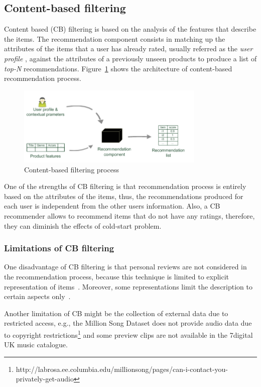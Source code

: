 \subsection{Content-based filtering}
Content based (CB) filtering is based on the analysis of the features that describe the items. The recommendation component consists in matching up the attributes of the items that a user has already rated, usually referred as the \textit{user profile} \parencite{Lops2011}, against the attributes of a previously unseen products to produce a list of \emph{top-N} recommendations. Figure~\ref{fig:cb} shows the architecture of content-based recommendation process.
\begin{figure}[ht!]
	\centering
	\includegraphics[width=0.8\textwidth]{chapter2/content-based-recommender1.png}
	\caption{Content-based filtering process \parencite{1_blogseagatesoftcom_2015}}
	\label{fig:cb}
\end{figure}

One of the strengths of CB filtering is that recommendation process is entirely based on the attributes of the items, thus, the recommendations produced for each user is independent from the other users information. Also, a CB recommender allows to recommend items that do not have any ratings, therefore, they can diminish the effects of cold-start problem. \parencite{Lops2011}

\subsubsection{Limitations of CB filtering}
One disadvantage of CB filtering is that personal reviews are not considered in the recommendation process, because this technique is limited to explicit representation of items~\parencite{1242}. Moreover, some representations limit the description to certain aspects only~\parencite{Lops2011}.

Another limitation of CB might be the collection of external data due to restricted access, e.g., the Million Song Dataset \parencite{Bertin-Mahieux2011} does not provide audio data due to copyright restrictions\footnote{http://labrosa.ee.columbia.edu/millionsong/pages/can-i-contact-you-privately-get-audio} and some preview clips are not available in the 7digital UK music catalogue. 

